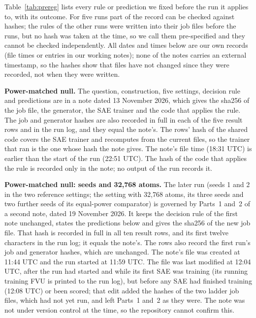 \documentclass{article}
\begin{document}
Table~\ref{tab:prereg} lists every rule or prediction we fixed before the run it applies to, with its outcome. For five runs part of the record can be checked against hashes; the rules of the other runs were written into their job files before the runs, but no hash was taken at the time, so we call them pre-specified and they cannot be checked independently. All dates and times below are our own records (file times or entries in our working notes); none of the notes carries an external timestamp, so the hashes show that files have not changed since they were recorded, not when they were written.

\textbf{Power-matched null.} The question, construction, five settings, decision rule and predictions are in a note dated 13 November 2026, which gives the sha256 of the job file, the generator, the SAE trainer and the code that applies the rule. The job and generator hashes are also recorded in full in each of the five result rows and in the run log, and they equal the note's. The rows' hash of the shared code covers the SAE trainer and recomputes from the current files, so the trainer that ran is the one whose hash the note gives. The note's file time (18:31 UTC) is earlier than the start of the run (22:51 UTC). The hash of the code that applies the rule is recorded only in the note; no output of the run records it.

\textbf{Power-matched null: seeds and 32,768 atoms.} The later run (seeds 1 and 2 in the two reference settings; the setting with 32,768 atoms, its three seeds and two further seeds of its equal-power comparator) is governed by Parts~1 and~2 of a second note, dated 19 November 2026. It keeps the decision rule of the first note unchanged, states the predictions below and gives the sha256 of the new job file. That hash is recorded in full in all ten result rows, and its first twelve characters in the run log; it equals the note's. The rows also record the first run's job and generator hashes, which are unchanged. The note's file was created at 11:44 UTC and the run started at 11:59 UTC. The file was last modified at 12:04 UTC, after the run had started and while its first SAE was training (its running training FVU is printed to the run log), but before any SAE had finished training (12:08 UTC) or been scored; that edit added the hashes of the two ladder job files, which had not yet run, and left Parts~1 and~2 as they were. The note was not under version control at the time, so the repository cannot confirm this.
\end{document}
